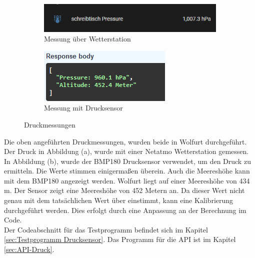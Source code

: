 \begin{figure}[H]
    \centering
    \begin{subfigure}[b]{0.7\textwidth}
        \centering
        \includegraphics[width=\textwidth]{image/druckvergleich.png}
        \caption{Messung über Wetterstation}
        \label{fig:bild1}
    \end{subfigure}
    \hfill
    \begin{subfigure}[b]{0.5\textwidth}
        \centering
        \includegraphics[width=\textwidth]{image/druckausgabe.png}
        \caption{Messung mit Drucksensor}
        \label{fig:bild2}
    \end{subfigure}
    \caption{Druckmessungen}
    \label{fig:zwei_bilder}
\end{figure}
Die oben angeführten Druckmessungen, wurden beide in Wolfurt durchgeführt. Der Druck in Abbildung (a), wurde mit einer Netatmo Wetterstation\autocite{Netatmo} gemessen. In Abbildung (b), wurde der BMP180 Drucksensor verwendet, um den Druck zu ermitteln. Die Werte stimmen einigermaßen überein. Auch die Meereshöhe kann mit dem BMP180 angezeigt werden. Wolfurt liegt auf einer Meereshöhe von 434 m. Der Sensor zeigt eine Meereshöhe von 452 Metern an. Da dieser Wert nicht genau mit dem tatsächlichen Wert über einstimmt, kann eine Kalibrierung durchgeführt werden. Dies erfolgt durch eine Anpassung an der Berechnung im Code.\\
\vspace{3mm}
Der Codeabschnitt für das Testprogramm befindet sich im Kapitel  \ref{sec:Testprogramm Drucksensor}. Das Programm für die API ist im Kapitel \ref{sec:API-Druck}.
